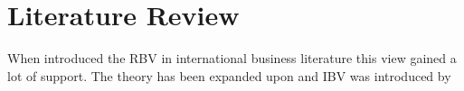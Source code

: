 \chapter{Literature Review}


When \cite{Barney:1991} introduced the \gls{RBV} in international business literature this view gained a lot of support. 
The theory has been expanded upon and \gls{IBV} was introduced by \cite{Kostova:1999,Meyer:2009,Wang:2012}
